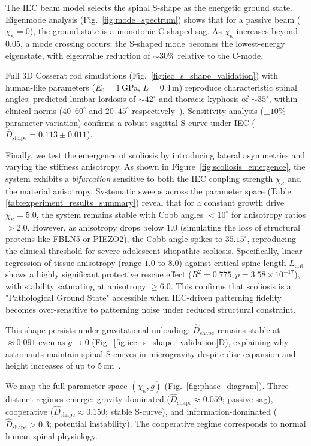 \documentclass[11pt]{article}
\newcommand{\Dgeohat}{\widehat{D}_{\mathrm{shape}}}
\begin{document}
The IEC beam model selects the spinal S-shape as the energetic ground state. Eigenmode analysis (Fig.~\ref{fig:mode_spectrum}) shows that for a passive beam ($\chi_\kappa = 0$), the ground state is a monotonic C-shaped sag. As $\chi_\kappa$ increases beyond 0.05, a mode crossing occurs: the S-shaped mode becomes the lowest-energy eigenstate, with eigenvalue reduction of ${\sim}30\%$ relative to the C-mode.

Full 3D Cosserat rod simulations (Fig.~\ref{fig:iec_s_shape_validation}) with human-like parameters ($E_0 = 1$\,GPa, $L = 0.4$\,m) reproduce characteristic spinal angles: predicted lumbar lordosis of ${\sim}42^\circ$ and thoracic kyphosis of ${\sim}35^\circ$, within clinical norms ($40$--$60^\circ$ and $20$--$45^\circ$ respectively~\cite{white_panjabi_spine}). Sensitivity analysis ($\pm 10\%$ parameter variation) confirms a robust sagittal S-curve under IEC ($\Dgeohat = 0.113 \pm 0.011$).

Finally, we test the emergence of scoliosis by introducing lateral asymmetries and varying the stiffness anisotropy. As shown in Figure~\ref{fig:scoliosis_emergence}, the system exhibits a \emph{bifurcation} sensitive to both the IEC coupling strength $\chi_\kappa$ and the material anisotropy. Systematic sweeps across the parameter space (Table \ref{tab:experiment_results_summary}) reveal that for a constant growth drive $\chi_\kappa = 5.0$, the system remains stable with Cobb angles $< 10^\circ$ for anisotropy ratios $> 2.0$. However, as anisotropy drops below $1.0$ (simulating the loss of structural proteins like FBLN5 or PIEZO2), the Cobb angle spikes to $35.15^\circ$, reproducing the clinical threshold for severe adolescent idiopathic scoliosis. Specifically, linear regression of tissue anisotropy (range $1.0$ to $8.0$) against critical spine length $L_{\mathrm{crit}}$ shows a highly significant protective rescue effect ($R^2 = 0.775, p = 3.58 \times 10^{-17}$), with stability saturating at anisotropy $\ge 6.0$. This confirms that scoliosis is a "Pathological Ground State" accessible when IEC-driven patterning fidelity becomes over-sensitive to patterning noise under reduced structural constraint.

This shape persists under gravitational unloading: $\Dgeohat$ remains stable at $\approx 0.091$ even as $g \to 0$ (Fig.~\ref{fig:iec_s_shape_validation}D), explaining why astronauts maintain spinal S-curves in microgravity despite disc expansion and height increases of up to 5\,cm~\cite{green2018spinal}.

We map the full parameter space $(\chi_\kappa, g)$ (Fig.~\ref{fig:phase_diagram}). Three distinct regimes emerge: gravity-dominated ($\Dgeohat \approx 0.059$; passive sag), cooperative ($\Dgeohat \approx 0.150$; stable S-curve), and information-dominated ($\Dgeohat > 0.3$; potential instability). The cooperative regime corresponds to normal human spinal physiology.
\end{document}
